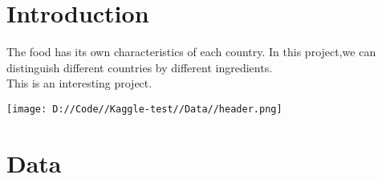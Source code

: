 \section{Introduction}\label{sec-intro}

The food has its own characteristics of each country.
In this project,we can distinguish different countries by
different ingredients.\\
This is an interesting project.


\texttt{[image: D://Code//Kaggle-test//Data//header.png]}





\section{Data} \label{sec-preliminaries}

